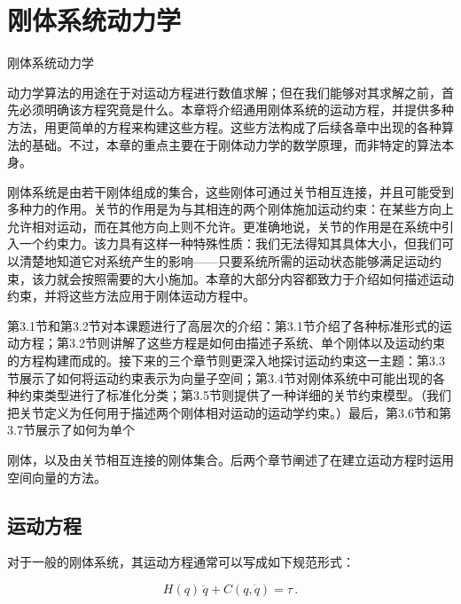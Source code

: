 \documentclass[10pt,a4paper]{book}
\theoremstyle{thmstyle} %
\theoremstyle{defstyle} %
\theoremstyle{prostyle} %
\begin{document}
\chapter{刚体系统动力学}





刚体系统动力学



动力学算法的用途在于对运动方程进行数值求解；但在我们能够对其求解之前，首先必须明确该方程究竟是什么。本章将介绍通用刚体系统的运动方程，并提供多种方法，用更简单的方程来构建这些方程。这些方法构成了后续各章中出现的各种算法的基础。不过，本章的重点主要在于刚体动力学的数学原理，而非特定的算法本身。



刚体系统是由若干刚体组成的集合，这些刚体可通过关节相互连接，并且可能受到多种力的作用。关节的作用是为与其相连的两个刚体施加运动约束：在某些方向上允许相对运动，而在其他方向上则不允许。更准确地说，关节的作用是在系统中引入一个约束力。该力具有这样一种特殊性质：我们无法得知其具体大小，但我们可以清楚地知道它对系统产生的影响——只要系统所需的运动状态能够满足运动约束，该力就会按照需要的大小施加。本章的大部分内容都致力于介绍如何描述运动约束，并将这些方法应用于刚体运动方程中。



第3.1节和第3.2节对本课题进行了高层次的介绍：第3.1节介绍了各种标准形式的运动方程；第3.2节则讲解了这些方程是如何由描述子系统、单个刚体以及运动约束的方程构建而成的。接下来的三个章节则更深入地探讨运动约束这一主题：第3.3节展示了如何将运动约束表示为向量子空间；第3.4节对刚体系统中可能出现的各种约束类型进行了标准化分类；第3.5节则提供了一种详细的关节约束模型。（我们把关节定义为任何用于描述两个刚体相对运动的运动学约束。）最后，第3.6节和第3.7节展示了如何为单个



刚体，以及由关节相互连接的刚体集合。后两个章节阐述了在建立运动方程时运用空间向量的方法。



\section{运动方程}





对于一般的刚体系统，其运动方程通常可以写成如下规范形式：



$$
H ( q ) \, \ddot { q } + C ( q , \dot { q } ) = \tau \, .
$$
\end{document}
